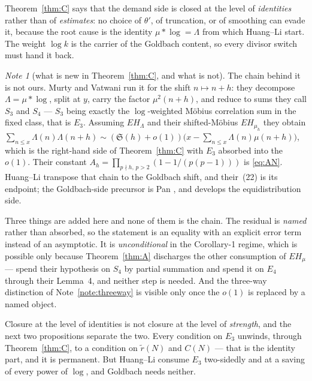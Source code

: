 \documentclass[11pt,a4paper]{article}
\theoremstyle{plain}
\theoremstyle{definition}
\theoremstyle{remark}
\newtheorem{note}[theorem]{Note}
\begin{document}
Theorem~\ref{thm:C} says that the demand side is closed at the level
of \emph{identities} rather than of \emph{estimates}: no choice of
$\theta'$, of truncation, or of smoothing can evade it, because the
root cause is the identity $\mu*\log=\Lambda$ from which Huang--Li
start. The weight $\log k$ is the carrier of the Goldbach content, so
every divisor switch must hand it back.

\begin{note}[what is new in Theorem~\ref{thm:C}, and what is
not]\label{note:thmCprior}
The chain behind it is not ours. Murty and Vatwani \cite{MV17} run it
for the shift $n\mapsto n+h$: they decompose $\Lambda=\mu*\log$, split
at $y$, carry the factor $\mu^2(n+h)$, and reduce to sums they call
$S_3$ and $S_4$ --- $S_3$ being exactly the $\log$-weighted M\"obius
correlation sum in the fixed class, that is $E_3$. Assuming
$EH_\Lambda$ and their shifted-M\"obius $EH_{\mu_h}$ they obtain
$\sum_{n\le x}\Lambda(n)\Lambda(n+h)\sim(\mathfrak S(h)+o(1))
\bigl(x-\sum_{n\le x}\Lambda(n)\mu(n+h)\bigr)$, which is the
right-hand side of Theorem~\ref{thm:C} with $E_3$ absorbed into the
$o(1)$. Their constant $A_h=\prod_{p\nmid h,\,p>2}(1-1/(p(p-1)))$ is
\eqref{eq:AN}. Huang--Li \cite{HL} transpose that chain to the Goldbach
shift, and their~(22) is its endpoint; the Goldbach-side precursor is
Pan \cite{Pan82}, and \cite{Vat19} develops the equidistribution side.

Three things are added here and none of them is the chain. The residual
is \emph{named} rather than absorbed, so the statement is an equality
with an explicit error term instead of an asymptotic. It is
\emph{unconditional} in the Corollary-1 regime, which is possible only
because Theorem~\ref{thm:A} discharges the other consumption of
$EH_\mu$ --- \cite{MV17} spend their hypothesis on $S_4$ by partial
summation and \cite{HL} spend it on $E_4$ through their Lemma~4, and
neither step is needed. And the three-way distinction of
Note~\ref{note:threeway} is visible only once the $o(1)$ is replaced by
a named object.
\end{note}

Closure at the level of identities is not closure at the level of
\emph{strength}, and the next two propositions separate the two. Every
condition on $E_3$ unwinds, through Theorem~\ref{thm:C}, to a
condition on $\tilde r(N)$ and $C(N)$ --- that is the identity part,
and it is permanent. But Huang--Li consume $E_3$ two-sidedly and at a
saving of every power of $\log$, and Goldbach needs neither.
\end{document}
